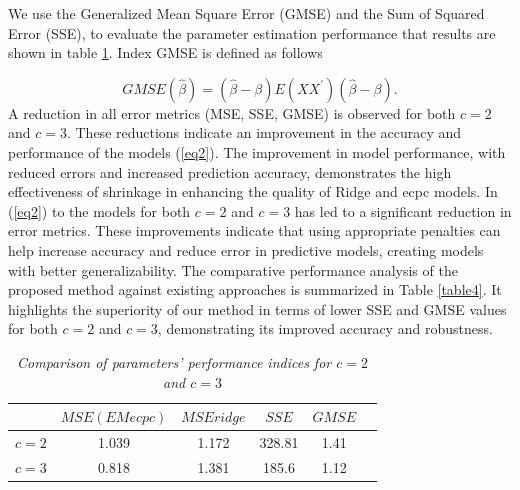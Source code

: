 We use the Generalized Mean Square Error (GMSE) and the Sum of Squared Error (SSE), to evaluate the parameter estimation performance that results are shown in table \ref{table3}. Index GMSE is defined as follows

\[
GMSE(\hat{\beta}) =  (\hat{\beta} - \beta)E(XX^{′})(\hat{\beta} - \beta) .
\]
A reduction in all error metrics (MSE, SSE, GMSE) is observed for both $ c = 2 $ and $ c = 3 $. These reductions indicate an improvement in the accuracy and performance of the models (\ref{eq2}). The improvement in model performance, with reduced errors and increased prediction accuracy, demonstrates the high effectiveness of shrinkage in enhancing the quality of Ridge and ecpc models. In (\ref{eq2}) to the models for both $ c = 2 $ and $ c = 3 $ has led to a significant reduction in error metrics. These improvements indicate that using appropriate penalties can help increase accuracy and reduce error in predictive models, creating models with better generalizability. The comparative performance analysis of the proposed method against existing approaches is summarized in Table \ref{table4}. It highlights the superiority of our method in terms of lower SSE and GMSE values for both $ c = 2 $ and $ c = 3 $, demonstrating its improved accuracy and robustness.
\begin{table}
	\centering
	\caption{ \small{ \it{Comparison of parameters' performance indices for $c=2$ and $c=3$} }} \label{table3}
	\begin{tabular}{|c|c|c|c|c|c|}
		\hline
		$ $ & $MSE(EMecpc)$ & 	$ MSEridge $ & $ SSE $ & $GMSE$ \\
		\hline
		$ c = 2 $ &  1.039  & 1.172  & 328.81 &  1.41\\
		\hline
		$ c = 3 $ & 0.818 & 1.381  & 185.6 & 1.12 \\
		\hline
	\end{tabular}
\end{table}

